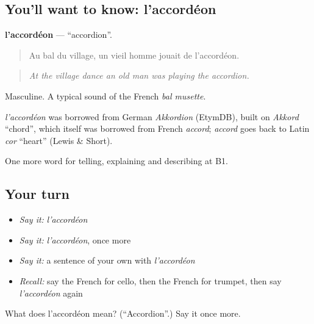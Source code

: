 \subsection*{You'll want to know: l'accordéon}
\textbf{l'accordéon} — \textquotedblleft{}accordion\textquotedblright{}.

\begin{quote}
Au bal du village, un vieil homme jouait de l'accordéon.
\end{quote}

\begin{quote}
\emph{At the village dance an old man was playing the accordion.}
\end{quote}

Masculine. A typical sound of the French \emph{bal musette}.

\begin{cousinweb}
\emph{l'accordéon} was borrowed from German \emph{Akkordion} (EtymDB), built on \emph{Akkord} \textquotedblleft{}chord\textquotedblright{}, which itself was borrowed from French \emph{accord}; \emph{accord} goes back to Latin \emph{cor} \textquotedblleft{}heart\textquotedblright{} (Lewis \& Short).
\end{cousinweb}

\begin{grammarlens}[title={What you've built}]
One more word for telling, explaining and describing at B1.
\end{grammarlens}

\subsection*{Your turn}
\begin{itemize}
\raggedright
  \item \emph{Say it:} \emph{l'accordéon}
  \item \emph{Say it:} \emph{l'accordéon}, once more
  \item \emph{Say it:} a sentence of your own with \emph{l'accordéon}
  \item \emph{Recall:} say the French for cello, then the French for trumpet, then say \emph{l'accordéon} again
\end{itemize}

\begin{tcolorbox}[breakable,colback=teal!4,colframe=teal!35!black,title={Before you move on}]
What does l'accordéon mean? (\textquotedblleft{}Accordion\textquotedblright{}.) Say it once more.
\end{tcolorbox}

